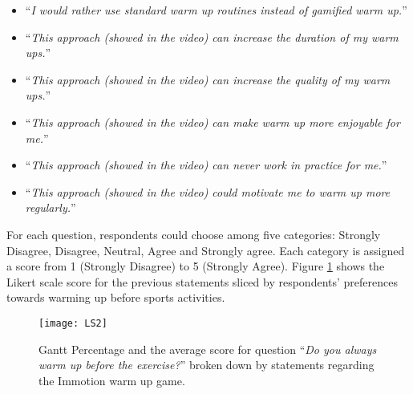 \begin{itemize}
\item ``\textit{I would rather use standard warm up routines instead of gamified warm up.}''
\item ``\textit{This approach (showed in the video) can increase the duration of my warm ups.}''
\item ``\textit{This approach (showed in the video) can increase the quality of my warm ups.}''
\item ``\textit{This approach (showed in the video) can make warm up more enjoyable for me.}''
\item ``\textit{This approach (showed in the video) can never work in practice for me.}''
\item ``\textit{This approach (showed in the video) could motivate me to warm up more regularly.}''
\end{itemize}
For each question, respondents could choose among five categories: Strongly Disagree, Disagree, Neutral, Agree and Strongly agree. Each category is assigned a score from 1 (Strongly Disagree) to 5 (Strongly Agree). Figure \ref{fig:LS2} shows the Likert scale score for the previous statements sliced by respondents' preferences towards warming up before sports activities.\\ 
\begin{figure}[h]
    \centering
    \texttt{[image: LS2]}
    \caption{Gantt Percentage and the average score for question ``\textit{Do you always warm up before the exercise?}'' broken down by statements regarding the Immotion warm up game.}
    \label{fig:LS2}
\end{figure}\\ 
